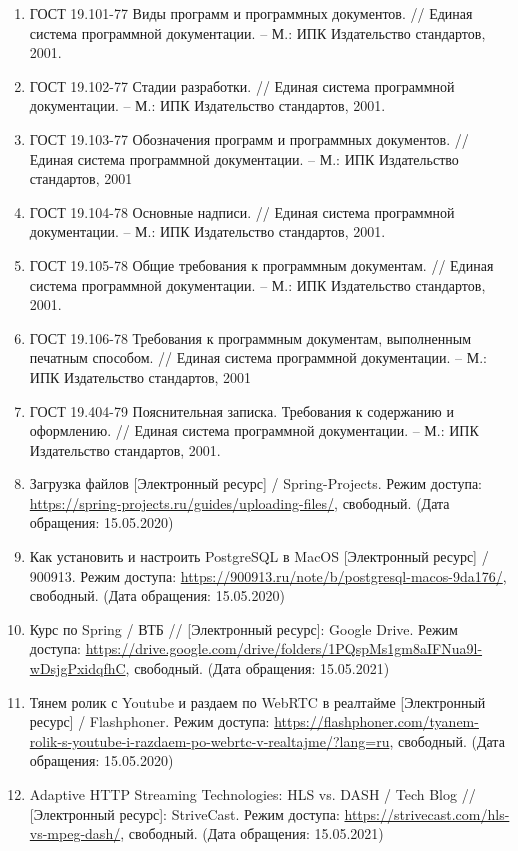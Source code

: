 \documentclass{../includes/TechDoc}
\begin{document}
    \begin{enumerate}
        \item ГОСТ 19.101-77 Виды программ и программных документов. // Единая система программной документации. – М.: ИПК Издательство стандартов, 2001.
        \item ГОСТ 19.102-77 Стадии разработки. // Единая система программной документации. – М.: ИПК Издательство стандартов, 2001.
        \item ГОСТ 19.103-77 Обозначения программ и программных документов. // Единая система программной документации. – М.: ИПК Издательство стандартов, 2001
        \item ГОСТ 19.104-78 Основные надписи. // Единая система программной документации. – М.: ИПК Издательство стандартов, 2001.
        \item ГОСТ 19.105-78 Общие требования к программным документам. // Единая система программной документации. – М.: ИПК Издательство стандартов, 2001.
        \item ГОСТ 19.106-78 Требования к программным документам, выполненным печатным способом. // Единая система программной документации. – М.: ИПК Издательство стандартов, 2001
        \item ГОСТ 19.404-79 Пояснительная записка. Требования к содержанию и оформлению. // Единая система программной документации. – М.: ИПК Издательство стандартов, 2001.
        \item Загрузка файлов [Электронный ресурс] / Spring-Projects. Режим доступа: \url{https://spring-projects.ru/guides/uploading-files/}, свободный. (Дата обращения: 15.05.2020)
        \item Как установить и настроить PostgreSQL в MacOS [Электронный ресурс] / 900913. Режим доступа: \url{https://900913.ru/note/b/postgresql-macos-9da176/}, свободный. (Дата обращения: 15.05.2020)
        \item Курс по Spring / ВТБ // [Электронный ресурс]: Google Drive. Режим доступа: \url{https://drive.google.com/drive/folders/1PQspMs1gm8aIFNua9l-wDsjgPxidqfhC}, свободный. (Дата обращения: 15.05.2021)
        \item Тянем ролик с Youtube и раздаем по WebRTC в реалтайме [Электронный ресурс] / Flashphoner. Режим доступа: \url{https://flashphoner.com/tyanem-rolik-s-youtube-i-razdaem-po-webrtc-v-realtajme/?lang=ru}, свободный. (Дата обращения: 15.05.2020)
        \item Adaptive HTTP Streaming Technologies: HLS vs. DASH / Tech Blog // [Электронный ресурс]: StriveCast. Режим доступа: \url{https://strivecast.com/hls-vs-mpeg-dash/}, свободный. (Дата обращения: 15.05.2021)

\end{enumerate}
\end{document}
